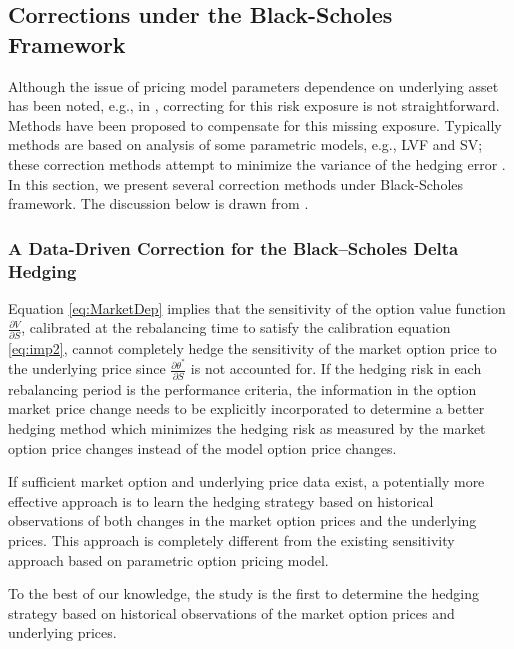 \documentclass[letterpaper,12pt,titlepage,oneside,final]{book}
\numberwithin{equation}{section}
\theoremstyle{definition}
\begin{document}
\subsection{Corrections under the Black-Scholes Framework}
Although the issue of pricing model parameters dependence on underlying asset has been noted, e.g., in \citep{coleman2001,hulloptimal}, correcting for this risk exposure is not straightforward.
Methods have been proposed to compensate for this missing exposure.  Typically methods are based on analysis of some parametric models, e.g., LVF and SV; these correction methods attempt to minimize the variance of the hedging error \citep{hulloptimal,alexander09,Angelini09,Angelini10,Goutte13}. In this section, we present several correction methods under Black-Scholes  framework. The discussion below is  drawn from \cite{hulloptimal,hagan2017bartlett,bartlett2006hedging}.
\subsubsection{A Data-Driven Correction for the Black–Scholes Delta Hedging}




Equation \eqref{eq:MarketDep} implies that the sensitivity of the option value function $\frac{\partial V}{\partial S}$, calibrated at the rebalancing time to
satisfy the calibration equation \eqref{eq:imp2}, cannot completely hedge  
the sensitivity of the market option price to the underlying price since $\frac{\partial \theta^*}{\partial S}$ is not accounted for.
If the hedging risk in each rebalancing period is the performance criteria, the information in the option market price change needs to be explicitly incorporated to determine a better hedging method which minimizes the hedging risk as measured by the
market option price changes instead of the model option price changes.


If sufficient market option and underlying price data exist, a potentially more effective approach is to learn the hedging strategy 
based on historical observations of both  changes in the market option prices and the underlying prices. This approach is completely different from the existing  sensitivity approach based on parametric option pricing 
model.

To the best of our knowledge, the study
\cite{hulloptimal} is the first to determine the hedging strategy based on historical observations of the market option prices and 
underlying prices.  
\end{document}
